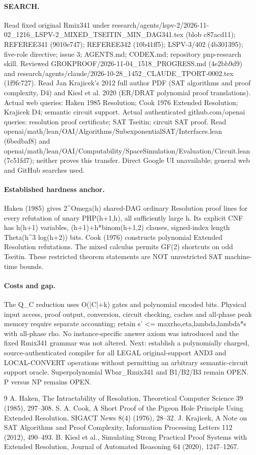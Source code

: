 \documentclass[11pt]{article}
\begin{document}
\paragraph{SEARCH.} Read fixed original Rmix341 under research/agents/lspv-2/2026-11-02_1216_LSPV-2_MIXED_TSEITIN_MIN_DAG341.tex (blob c87acd11); REFEREE341 (9010e747); REFEREE342 (10b41ff5); LSPV-3/402 (4b301395); five-role directive; issue 3; AGENTS.md; CODEX.md; repository pnp-research skill. Reviewed GROKPROOF/2026-11-04_1518_PROGRESS.md (4e2bb9d9) and research/agents/claude/2026-10-28_1452_CLAUDE_TPORT-0002.tex (1f9fc727). Read Jan Krajicek's 2012 full author PDF (SAT algorithms and proof complexity, D4) and Kiesl et al. 2020 (ER/DRAT polynomial proof translations). Actual web queries: Haken 1985 Resolution; Cook 1976 Extended Resolution; Krajicek D4; semantic circuit support. Actual authenticated github.com/openai queries: resolution proof certificate; SAT Tseitin; circuit SAT proof. Read openai/math/lean/OAI/Algorithms/SubexponentialSAT/Interfaces.lean (6bedbaf8) and openai/math/lean/OAI/Computability/SpaceSimulation/Evaluation/Circuit.lean (7c51fd7); neither proves this transfer. Direct Google UI unavailable; general web and GitHub searches used.
\paragraph{Established hardness anchor.} Haken (1985) gives 2^{Omega(h)} shared-DAG ordinary Resolution proof lines for every refutation of unary PHP(h+1,h), all sufficiently large h. Its explicit CNF has h(h+1) variables, (h+1)+h*binom(h+1,2) clauses, signed-index length Theta(h^3 log(h+2)) bits. Cook (1976) constructs polynomial Extended Resolution refutations. The mixed calculus permits GF(2) shortcuts on odd Tseitin. These restricted theorem statements are NOT unrestricted SAT machine-time bounds.
\paragraph{Costs and gap.} The Q_C reduction uses O(|C|+k) gates and polynomial encoded bits. Physical input access, proof output, conversion, circuit checking, caches and all-phase peak memory require separate accounting; retain s' <= max{rho,eta,lambda,lambda*s} with all-phase rho. No instance-specific answer axiom was introduced and the fixed Rmix341 grammar was not altered. Next: establish a polynomially charged, source-authenticated compiler for all LEGAL original-support AND3 and LOCAL-CONVERT operations without permitting an arbitrary semantic-circuit support oracle. Superpolynomial Wbar_Rmix341 and B1/B2/B3 remain OPEN. P versus NP remains OPEN.
\begin{thebibliography}{9}
 A. Haken, The Intractability of Resolution, Theoretical Computer Science 39 (1985), 297--308.
 S. A. Cook, A Short Proof of the Pigeon Hole Principle Using Extended Resolution, SIGACT News 8(4) (1976), 28--32.
 J. Krajicek, A Note on SAT Algorithms and Proof Complexity, Information Processing Letters 112 (2012), 490--493.
 B. Kiesl et al., Simulating Strong Practical Proof Systems with Extended Resolution, Journal of Automated Reasoning 64 (2020), 1247--1267.
\end{thebibliography}
\end{document}
